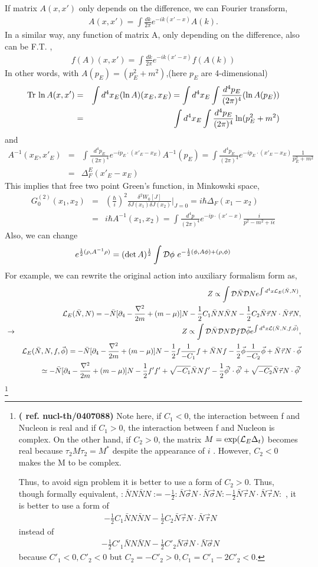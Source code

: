 \documentclass[10pt]{book}
\newcommand{\bea}{\begin{eqnarray}}
\newcommand{\eea}{\end{eqnarray}}
\newcommand{\no}{\nonumber \\}
\newcommand{\del}{\partial}
\begin{document}
If matrix $A(x,x')$ only depends on the difference, we can Fourier transform,
\bea 
A(x,x')=\int \frac{dk}{2\pi} e^{-ik(x'-x)}A(k).
\eea 
In a similar way, any function of matrix A, only depending on the difference,
 also can be F.T. ,
\bea 
f(A)(x,x')=\int \frac{dk}{2\pi} e^{-ik(x'-x)} f(A(k))
\eea 
In other words,
with $A(p_E)=(p_E^2+m^2)$,(here $p_E$ are 4-dimensional)
\bea 
{\rm Tr}\ {\ln A(x,x')}&=&\int d^4 x_E (\ln A)(x_E,x_E)
       =\int d^4 x_E \int \frac{d^4 p_E}{(2\pi)^4}(\ln A(p_E)) \no 
       &=&\int d^4 x_E \int \frac{d^4 p_E}{(2\pi)^4}\ln (p_E^2+m^2) 
\eea 
and 
\bea 
A^{-1}(x_E,x'_E)&=&\int \frac{d^4 p_E}{(2\pi)^4} e^{-ip_E\cdot(x'_E-x_E)} A^{-1}(p_E)
                =\int \frac{d^4 p_E}{(2\pi)^4} e^{-ip_E\cdot(x'_E-x_E)}\frac{1}{p_E^2+m^2} \no 
               &=&\Delta_F^E(x'_E-x_E)              
\eea 
This implies that free two point Green's function, in Minkowski space,
\bea 
G_0^{(2)}(x_1,x_2)&=&(\frac{\hbar}{i})^2 \frac{\delta^2 W_0[J]}{\delta J(x_1)\delta J(x_2)}|_{J=0}
   =i\hbar\Delta_F(x_1-x_2)\no 
   &=&i\hbar A^{-1}(x_1,x_2)=\int \frac{d^4 p}{(2\pi)^4} e^{-ip\cdot(x'-x)}\frac{i}{p^2-m^2+i\epsilon}
\eea 
Also, we can change 
\bea 
e^{\frac{1}{2}(\rho,A^{-1}\rho)}=(\det A)^{\frac{1}{2}}
 \int {\cal D}\phi\ e^{-\frac{1}{2}(\phi,A\phi)+(\rho,\phi)}
\eea 
For example, we can rewrite the original action into auxiliary formalism form as,
\bea 
& & Z\propto \int{\cal D}\bar{N}{\cal D}N e^{\int d^4x {\cal L}_E(\bar{N},N)},\no 
& &{\cal L}_E(\bar{N},N)=-\bar{N}[\del_4-\frac{\nabla^2}{2m}+(m-\mu)]N
           -\frac{1}{2}C_1 \bar{N}N\bar{N}N
           -\frac{1}{2}C_2\bar{N}{\vec \tau} N\cdot\bar{N}{\vec \tau} N,\no 
 &\rightarrow& 
     Z \propto \int{\cal D}\bar{N}{\cal D}N{\cal D}f{\cal D}{\vec\phi} 
      e^{\int d^4x {\cal L}(\bar{N},N,f,{\vec{\phi}})},\no
& & {\cal L}_E(\bar{N},N,f,{\vec{\phi}})
     =-\bar{N}[\del_4-\frac{\nabla^2}{2m}+(m-\mu)]N
      -\frac{1}{2}f\frac{1}{-C_1}f
      +\bar{N}N f
      -\frac{1}{2}{\vec{\phi}}\frac{1}{-C_2}{\vec{\phi}}
      +\bar{N}{\vec \tau} N\cdot{\vec{\phi}}\no 
  & &\simeq -\bar{N}[\del_4-\frac{\nabla^2}{2m}+(m-\mu)]N
        -\frac{1}{2}f' f'    +\sqrt{-C_1} \bar{N}N f'
        -\frac{1}{2}{\vec{\phi}'}\cdot{\vec{\phi}'}
        +\sqrt{-C_2}\bar{N}{\vec \tau} N\cdot{\vec{\phi}'}
\eea 
\footnote{{\bf ( ref. nucl-th/0407088)}
Note here, if $C_1<0$, the interaction between f and Nucleon is real
and if $C_1>0$, the interaction between f and Nucleon is complex.
On the other hand, 
if $C_{2}>0$, the matrix $M=\exp({\cal L}_E\Delta_t)$ 
becomes real because $\tau_2 M\tau_2=M^*$ despite the appearance of $i$
. However, $C_2<0$ makes the 
M to be complex. 

Thus, to avoid sign problem it is better to use a form of
$C_2>0$. 
Thus, though formally equivalent,
$:\bar{N}N\bar{N}N:=-\frac{1}{2}:\bar{N}{\vec \sigma} N\cdot\bar{N}{\vec \sigma} N:
-\frac{1}{2}\bar{N}{\vec \tau} N\cdot\bar{N}{\vec \tau} N: $
, it is better to use a form
of 
\bea 
-\frac{1}{2}C_1 \bar{N}N\bar{N}N
           -\frac{1}{2}C_2\bar{N}{\vec \tau} N\cdot\bar{N}{\vec \tau} N
\eea 
instead of 
\bea 
-\frac{1}{2}C'_1 \bar{N}N\bar{N}N
           -\frac{1}{2}C'_2\bar{N}{\vec \sigma} N\cdot\bar{N}{\vec \sigma} N
\eea            
because $C'_1<0,C'_2<0$ but $C_2=-C'_2>0, C_1=C'_1-2 C'_2<0$.
} 
\end{document}
